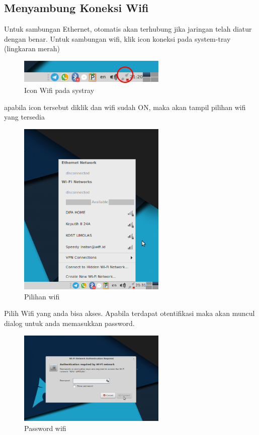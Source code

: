 \documentclass[12pt,]{article}
\begin{document}
	\newpage
	\subsection{Menyambung Koneksi Wifi}

	Untuk sambungan Ethernet, otomatis akan terhubung jika jaringan telah diatur dengan benar.
	Untuk sambungan wifi, klik icon koneksi pada system-tray (lingkaran merah)
	
	\begin{figure}[h]
		\centering
		\includegraphics[width=200pt]{png/systraywifi}
		\caption{Icon Wifi pada systray}
	\end{figure}

	apabila icon tersebut diklik dan wifi sudah ON, maka akan tampil pilihan wifi yang tersedia
	
	\begin{figure}[h]
		\centering
		\includegraphics[width=200pt]{png/wifi}
		\caption{Pilihan wifi}
	\end{figure}
	
	Pilih Wifi yang anda bisa akses. 
	Apabila terdapat otentifikasi maka akan muncul dialog untuk anda memasukkan password.
	
	\begin{figure}[h]
		\centering
		\includegraphics[width=200pt]{png/wifipass}
		\caption{Password wifi}
	\end{figure}
\end{document}
